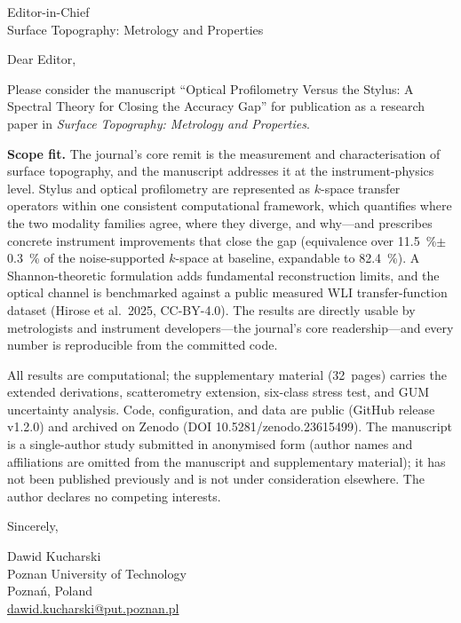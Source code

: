 \documentclass{letter}
\date{\today}
\begin{document}
\begin{letter}{Editor-in-Chief \\
Surface Topography: Metrology and Properties}

\opening{Dear Editor,}

Please consider the manuscript ``Optical Profilometry Versus the Stylus: A Spectral Theory for Closing the Accuracy Gap'' for publication as a research paper in \emph{Surface Topography: Metrology and Properties}.

\textbf{Scope fit.} The journal's core remit is the measurement and characterisation of surface topography, and the manuscript addresses it at the instrument-physics level. Stylus and optical profilometry are represented as $k$-space transfer operators within one consistent computational framework, which quantifies where the two modality families agree, where they diverge, and why---and prescribes concrete instrument improvements that close the gap (equivalence over \SI{11.5}{\percent}$\pm$\SI{0.3}{\percent} of the noise-supported $k$-space at baseline, expandable to \SI{82.4}{\percent}). A Shannon-theoretic formulation adds fundamental reconstruction limits, and the optical channel is benchmarked against a public measured WLI transfer-function dataset (Hirose et al.\ 2025, CC-BY-4.0). The results are directly usable by metrologists and instrument developers---the journal's core readership---and every number is reproducible from the committed code.

All results are computational; the supplementary material (32~pages) carries the extended derivations, scatterometry extension, six-class stress test, and GUM uncertainty analysis. Code, configuration, and data are public (GitHub release v1.2.0) and archived on Zenodo (DOI 10.5281/zenodo.23615499). The manuscript is a single-author study submitted in anonymised form (author names and affiliations are omitted from the manuscript and supplementary material); it has not been published previously and is not under consideration elsewhere. The author declares no competing interests.

\closing{Sincerely,}
Dawid Kucharski \\
Poznan University of Technology \\
Pozna\'n, Poland \\
\href{mailto:dawid.kucharski@put.poznan.pl}{dawid.kucharski@put.poznan.pl}

\end{letter}
\end{document}
